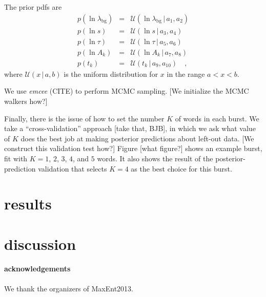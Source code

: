\documentclass[12pt]{article}
\newcommand{\project}[1]{\textsl{#1}}
\newcommand{\given}{\,|\,}
\newcommand{\Uniform}{{\mathcal U}}
\newcommand{\bg}{\mathrm{bg}}
\begin{document}
The prior pdfs are
\begin{eqnarray}
p(\ln\lambda_{\bg}) &=& \Uniform(\ln\lambda_{\bg}\given a_1, a_2)
\\
p(\ln s) &=& \Uniform(\ln s\given a_3, a_4)
\\
p(\ln\tau) &=& \Uniform(\ln\tau\given a_5, a_6)
\\
p(\ln A_k) &=& \Uniform(\ln A_k\given a_7, a_8)
\\
p(t_k) &=& \Uniform(t_k\given a_9, a_{10})
\quad,
\end{eqnarray}
where $\Uniform(x\given a, b)$ is the uniform distribution for $x$ in the range $a<x<b$.

We use \project{emcee} (CITE) to perform MCMC sampling.
[We initialize the MCMC walkers how?]

Finally, there is the issue of how to set the number $K$ of words in each burst.
We take a ``cross-validation'' approach [take that, BJB],
  in which we ask what value of $K$ does the best job at making posterior predictions
  about left-out data.
[We construct this validation test how?]
Figure [what figure?] shows an example burst,
  fit with $K=1$, $2$, $3$, $4$, and $5$ words.
It also shows the result of the posterior-prediction validation
  that selects $K=4$ as the best choice for this burst.

\section{results}

\section{discussion}

\paragraph{acknowledgements}
We thank the organizers of MaxEnt2013.
\end{document}
